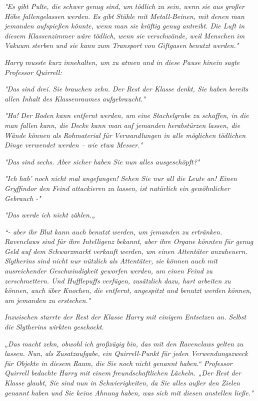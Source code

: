 {\emph{"Es gibt Pulte, die schwer genug sind, um tödlich zu sein, wenn sie aus großer Höhe fallengelassen werden. Es gibt Stühle mit Metall-Beinen, mit denen man jemanden aufspießen könnte, wenn man sie kräftig genug antreibt. Die Luft in diesem Klassenzimmer wäre tödlich, wenn sie verschwände, weil Menschen im Vakuum sterben und sie kann zum Transport von Giftgasen benutzt werden."}

\emph{Harry musste kurz innehalten, um zu atmen und in diese Pause hinein sagte Professor Quirrell:}

\emph{"Das sind drei. Sie brauchen zehn. Der Rest der Klasse denkt, Sie haben bereits allen Inhalt des Klassenraumes aufgebraucht."}

\emph{"\emph{Ha!}} \emph{Der Boden kann entfernt werden, um eine Stachelgrube zu schaffen, in die man fallen kann, die Decke kann man auf jemanden herabstürzen lassen, die Wände können als Rohmaterial für Verwandlungen in alle möglichen tödlichen Dinge verwendet werden -- wie etwa Messer."}

\emph{"Das sind sechs. Aber sicher haben Sie nun alles ausgeschöpft?"}

\emph{"Ich hab' noch nicht mal angefangen! Sehen Sie nur all die Leute an! Einen Gryffindor den Feind attackieren zu lassen, ist natürlich ein} \emph{\emph{gewöhnlicher}} \emph{Gebrauch -"}

\emph{"Das werde ich nicht zählen.„}

\emph{“- aber ihr Blut kann auch benutzt werden, um jemanden zu ertränken. Ravenclaws sind für ihre Intelligenz bekannt, aber ihre Organe könnten für genug Geld auf dem Schwarzmarkt verkauft werden, um einen Attentäter anzuheuern. Slytherins sind nicht nur nützlich als Attentäter, sie können auch mit ausreichender Geschwindigkeit geworfen werden, um einen Feind zu zerschmettern. Und Hufflepuffs verfügen, zusätzlich dazu, hart arbeiten zu können, auch über Knochen, die entfernt, angespitzt und benutzt werden können, um jemanden zu erstechen."}

\emph{Inzwischen starrte der Rest der Klasse Harry mit einigem Entsetzen an. Selbst die Slytherins wirkten geschockt.}

\emph{„Das macht zehn, obwohl ich großzügig bin, das mit den Ravenclaws gelten zu lassen. Nun, als Zusatzaufgabe, ein Quirrell-Punkt für jeden Verwendungszweck für Objekte in diesem Raum, die Sie noch nicht genannt haben.“ Professor Quirrell bedachte Harry mit einem} \emph{freundschaftlichen Lächeln. „Der Rest der Klasse glaubt, Sie sind nun in Schwierigkeiten, da Sie alles außer den Zielen genannt haben und Sie keine Ahnung haben, was sich mit diesen anstellen ließe."}

}

